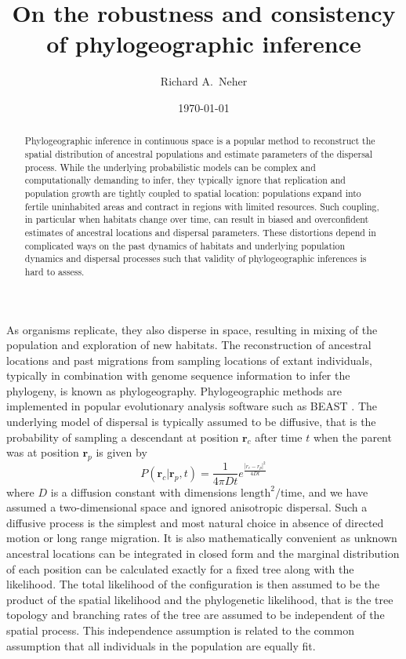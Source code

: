 \documentclass[aps,rmp, twocolumn]{revtex4}
\newcommand{\rvec}{\mathbf{r}}
\begin{document}
\title{On the robustness and consistency of phylogeographic inference}
\author{Richard A.~Neher}
\date{\today}
\begin{abstract}
Phylogeographic inference in continuous space is a popular method to reconstruct the spatial distribution of ancestral populations and estimate parameters of the dispersal process.
While the underlying probabilistic models can be complex and computationally demanding to infer, they typically ignore that replication and population growth are tightly coupled to spatial location: populations expand into fertile uninhabited areas and contract in regions with limited resources.
Such coupling, in particular when habitats change over time, can result in biased and overconfident estimates of ancestral locations and dispersal parameters.
These distortions depend in complicated ways on the past dynamics of habitats and underlying population dynamics and dispersal processes such that validity of phylogeographic inferences is hard to assess.
\end{abstract}

\maketitle
As organisms replicate, they also disperse in space, resulting in mixing of the population and exploration of new habitats.
The reconstruction of ancestral locations and past migrations from sampling locations of extant individuals, typically in combination with genome sequence information to infer the phylogeny, is known as phylogeography.
Phylogeographic methods are implemented in popular evolutionary analysis software such as BEAST \citep{lemey_bayesian_2009,lemey_phylogeography_2010}.
The underlying model of dispersal is typically assumed to be diffusive, that is the probability of sampling a descendant at position $\rvec_c$ after time $t$ when the parent was at position $\rvec_p$ is given by
\begin{equation}
    P(\rvec_c| \rvec_p, t) = \frac{1}{4\pi D t}e^{\frac{|r_c - r_p|^2}{4Dt}}
\end{equation}
where $D$ is a diffusion constant with dimensions $\mathrm{length}^2/\mathrm{time}$, and we have assumed a two-dimensional space and ignored anisotropic dispersal.
Such a diffusive process is the simplest and most natural choice in absence of directed motion or long range migration.
It is also mathematically convenient as unknown ancestral locations can be integrated in closed form and the marginal distribution of each position can be calculated exactly for a fixed tree along with the likelihood.
The total likelihood of the configuration is then assumed to be the product of the spatial likelihood and the phylogenetic likelihood, that is the tree topology and branching rates of the tree are assumed to be independent of the spatial process.
This independence assumption is related to the common assumption that all individuals in the population are equally fit.
\end{document}
